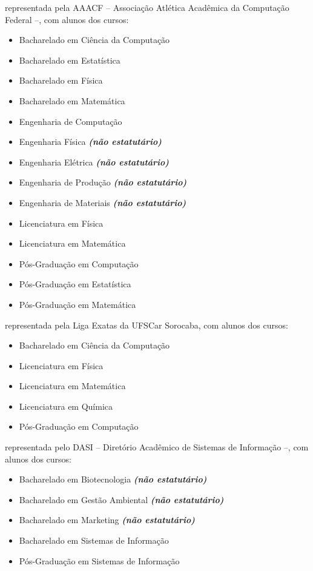\begin{article}
\begin{description}[noitemsep]
		\item[UFSCar - São Carlos] representada pela AAACF -- Associação Atlética Acadêmica da Computação Federal --, com alunos dos cursos:
		\begin{itemize}[noitemsep]
			\item Bacharelado em Ciência da Computação
			\item Bacharelado em Estatística
			\item Bacharelado em Física 
			\item Bacharelado em Matemática
			\item Engenharia de Computação
			\item Engenharia Física \textbf{\textit{(não estatutário)}}
			\item Engenharia Elétrica \textbf{\textit{(não estatutário)}}
			\item Engenharia de Produção \textbf{\textit{(não estatutário)}}
			\item Engenharia de Materiais \textbf{\textit{(não estatutário)}}
			\item Licenciatura em Física 
			\item Licenciatura em Matemática
			\item Pós-Graduação em Computação
			\item Pós-Graduação em Estatística
			\item Pós-Graduação em Matemática
		\end{itemize}

		\item[UFSCar - Sorocaba] representada pela Liga Exatas da UFSCar Sorocaba, com alunos dos cursos:
		\begin{itemize}[noitemsep]
			\item Bacharelado em Ciência da Computação
			\item Licenciatura em Física 
			\item Licenciatura em Matemática
			\item Licenciatura em Química
			\item Pós-Graduação em Computação
		\end{itemize}

		\item[USP Leste - EACH] representada pelo DASI -- Diretório Acadêmico de Sistemas de Informação --, com alunos dos cursos:
		\begin{itemize}[noitemsep]
			\item Bacharelado em Biotecnologia \textbf{\textit{(não estatutário)}}
			\item Bacharelado em Gestão Ambiental \textbf{\textit{(não estatutário)}}
			\item Bacharelado em Marketing \textbf{\textit{(não estatutário)}}
			\item Bacharelado em Sistemas de Informação
			\item Pós-Graduação em Sistemas de Informação
		\end{itemize}


\end{description}
\end{article}
